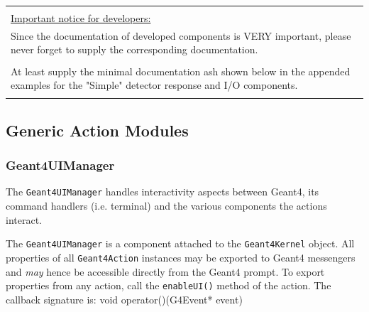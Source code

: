 \documentclass[10pt,a4paper]{article}
\begin{document}
\vspace{5cm}

\begin{center}
{\large{\bf{
\begin{tabular} {| p{15cm} |}
\hline\space  \\

\noindent
{\underline{Important notice for developers:}} \\

\noindent
Since the documentation of developed components is VERY important,
please never forget to supply the corresponding documentation.\\
\\
\noindent
At least supply the minimal documentation ash shown below
in the appended examples for the "Simple" detector response and I/O
components.
\\ \space\hline 
\end{tabular}
}}}
\end{center}
\clearpage

\subsection{Generic Action Modules}
\noindent
\subsubsection{Geant4UIManager}
\noindent
The {\tt{Geant4UIManager}} handles interactivity aspects between Geant4,
its command handlers (i.e. terminal) and the various components the actions
interact.

\noindent
The {\tt{Geant4UIManager}} is a component attached to the {\tt{Geant4Kernel}}
object. All properties of all {\tt{Geant4Action}} instances may be exported to 
Geant4 messengers and {\em{may}} hence be accessible directly from the Geant4 
prompt. To export properties from any action, call the {\tt{enableUI()}}
method of the action.
\noindent
The callback signature is: void operator()(G4Event* event)
\end{document}
